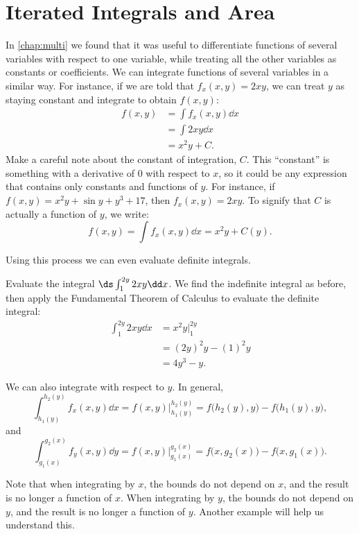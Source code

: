 \section{Iterated Integrals and Area}\label{sec:iterated_integrals}

In \autoref{chap:multi} we found that it was useful to differentiate functions of several variables with respect to one variable, while treating all the other variables as constants or coefficients. We can integrate functions of several variables in a similar way. For instance, if we are told that $f_x(x,y) = 2xy$, we can treat $y$ as staying constant and integrate to obtain $f(x,y)$:
\begin{align*}
	f(x,y)
	&= \int f_x(x,y)\dd x\\
	&= \int 2xy\dd x \\
	&= x^2y + C.
\end{align*}
Make a careful note about the constant of integration, $C$. This ``constant'' is something with a derivative of $0$ with respect to $x$, so it could be any expression that contains only constants and functions of $y$. For instance, if $f(x,y) = x^2y+ \sin y + y^3 + 17$, then $f_x(x,y) = 2xy$. To signify that $C$ is actually a function of $y$, we write:
\[f(x,y) = \int f_x(x,y)\dd x  = x^2y+C(y).\]

Using this process we can even evaluate definite integrals.

\begin{example}\label{ex_iterated1}
Evaluate the integral $\ds \int_1^{2y} 2xy\dd x$.
\solution
We find the indefinite integral as before, then apply the Fundamental Theorem of Calculus to evaluate the definite integral:
\begin{align*}
 \int_1^{2y} 2xy\dd x
 &= x^2y\Big|_1^{2y}\\
 &= (2y)^2y - (1)^2y \\
 &= 4y^3-y.
\end{align*}
\end{example}

We can also integrate with respect to $y$. In general,
\[\int_{h_1(y)}^{h_2(y)} f_x(x,y)\dd x = f(x,y)\Big|_{h_1(y)}^{h_2(y)} = f\bigl(h_2(y),y\bigr)-f\bigl(h_1(y),y\bigr),\]
and
\[\int_{g_1(x)}^{g_2(x)} f_y(x,y)\dd y = f(x,y)\Big|_{g_1(x)}^{g_2(x)} = f\bigl(x,g_2(x)\bigr)-f\bigl(x,g_1(x)\bigr).\]

Note that when integrating by $x$, the bounds do not depend on $x$, and the result is no longer a function of $x$.  When integrating by $y$, the bounds do not depend on $y$, and the result is no longer a function of $y$. Another example will help us understand this.


